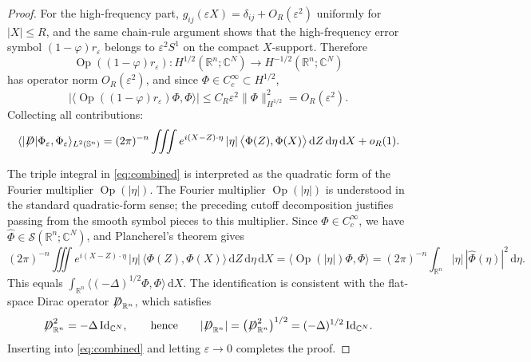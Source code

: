 \documentclass[10pt,a4paper]{amsart}
\def\slashiii#1{\setbox0=\hbox{$#1$}#1\hskip-\wd0\hbox to\wd0{\hss\sl/\/\hss}}
\begin{document}
\begin{proof}
	For the
	high-frequency part, $g_{ij}(\varepsilon X) = \delta_{ij} + O_R(\varepsilon^2)$
	uniformly for $|X| \le R$, and the same chain-rule argument shows that the high-frequency error symbol \((1-\varphi)r_\varepsilon\) belongs to
	\(\varepsilon^2 S^1\) on the compact \(X\)-support. Therefore
	\[
	\operatorname{Op}((1-\varphi)r_\varepsilon):
	H^{1/2}(\mathbb R^n;\mathbb C^N)
	\to
	H^{-1/2}(\mathbb R^n;\mathbb C^N)
	\]
	has operator norm \(O_R(\varepsilon^2)\), and since
	\(\Phi\in C_c^\infty\subset H^{1/2}\),
	\[
	\bigl|	\langle	\operatorname{Op}((1-\varphi)r_\varepsilon)\Phi,\Phi	\rangle	\bigr|	\le	C_R\varepsilon^2\|\Phi\|_{H^{1/2}}^2
	=	O_R(\varepsilon^2).
	\]
	Collecting all contributions:
	\begin{equation}\label{eq:combined}
		\langle |\slashiii{D}|\Phi_\varepsilon,\Phi_\varepsilon\rangle_{L^2(\mathbb{S}^n)}
		= (2\pi)^{-n}
		\iiint
		e^{i(X-Z)\cdot\eta}\,|\eta|\,
		\bigl\langle\Phi(Z),\Phi(X)\bigr\rangle
		\,\mathrm{d}Z\,\mathrm{d}\eta\,\mathrm{d}X
		+ o_R(1).
	\end{equation}
	
	The triple integral in \eqref{eq:combined} is interpreted as the quadratic
	form of the Fourier multiplier $\operatorname{Op}(|\eta|)$. The Fourier multiplier \(\operatorname{Op}(|\eta|)\) is understood in the
	standard quadratic-form sense; the preceding cutoff decomposition justifies
	passing from the smooth symbol pieces to this multiplier. Since
	$\Phi \in C_c^\infty$, we have $\hat\Phi \in \mathcal{S}(\mathbb{R}^n;\mathbb{C}^N)$,
	and Plancherel's theorem gives
	\[
	(2\pi)^{-n}
	\iiint
	e^{i(X-Z)\cdot\eta}\,|\eta|\,
	\langle\Phi(Z),\Phi(X)\rangle
	\,\mathrm{d}Z\,\mathrm{d}\eta\,\mathrm{d}X
	= \langle\operatorname{Op}(|\eta|)\Phi,\Phi\rangle
	= (2\pi)^{-n}\int_{\mathbb{R}^n}|\eta|\,|\hat\Phi(\eta)|^2\,\mathrm{d}\eta.
	\]
	This equals $\int_{\mathbb{R}^n}\langle(-\Delta)^{1/2}\Phi,\Phi\rangle\,\mathrm{d}X$.
	The identification is consistent with the flat-space Dirac operator
	$\slashiii{D}_{\mathbb{R}^n}$, which satisfies
	\[
	\slashiii{D}_{\mathbb{R}^n}^2 = -\Delta\,\mathrm{Id}_{\mathbb{C}^N},
	\qquad\text{hence}\qquad
	|\slashiii{D}_{\mathbb{R}^n}|
	= \bigl(\slashiii{D}_{\mathbb{R}^n}^2\bigr)^{1/2}
	= (-\Delta)^{1/2}\,\mathrm{Id}_{\mathbb{C}^N}.
	\]
	Inserting into \eqref{eq:combined} and letting $\varepsilon \to 0$ completes
	the proof.
\end{proof}
\end{document}
